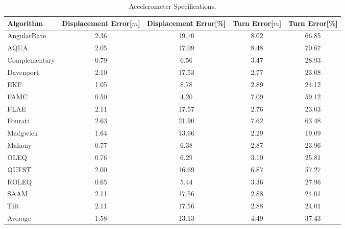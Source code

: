 \begin{table}[H]
    \begin{center}
        \begin{tabular}[t]{lcccc}
            \hline
            Algorithm                   & Displacement Error[$m$] & Displacement Error[\%]      & Turn Error[$m$]  & Turn Error[\%]             \\
            \hline 
            AngularRate            & 2.36  & 19.70 & 8.02 & 66.85              \\            AQUA            & 2.05  & 17.09 & 8.48 & 70.67              \\            Complementary            & 0.79  & 6.56 & 3.47 & 28.93              \\            Davenport            & 2.10  & 17.53 & 2.77 & 23.08              \\            EKF            & 1.05  & 8.78 & 2.89 & 24.12              \\            FAMC            & 0.50  & 4.20 & 7.09 & 59.12              \\            FLAE            & 2.11  & 17.57 & 2.76 & 23.03              \\            Fourati            & 2.63  & 21.90 & 7.62 & 63.48              \\            Madgwick            & 1.64  & 13.66 & 2.29 & 19.09              \\            Mahony            & 0.77  & 6.38 & 2.87 & 23.96              \\            OLEQ            & 0.76  & 6.29 & 3.10 & 25.81              \\            QUEST            & 2.00  & 16.69 & 6.87 & 57.27              \\            ROLEQ            & 0.65  & 5.44 & 3.36 & 27.96              \\            SAAM            & 2.11  & 17.56 & 2.88 & 24.01              \\            Tilt            & 2.11  & 17.56 & 2.88 & 24.01              \\
            \hline
            Average & 1.58 & 13.13 & 4.49 & 37.43
        \end{tabular}
        \caption{Accelerometer Specifications. }
        \label{tab:accelerometer_specification}
    \end{center}
\end{table}